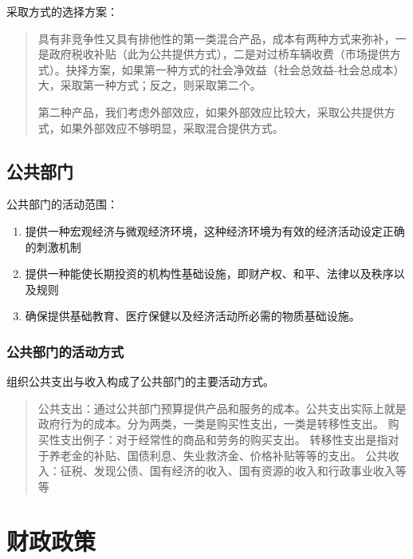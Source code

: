 \documentclass[
]{book}
\providecommand{\tightlist}{%
  \setlength{\itemsep}{0pt}\setlength{\parskip}{0pt}}
\begin{document}
采取方式的选择方案：

\begin{quote}
具有非竞争性又具有排他性的第一类混合产品，成本有两种方式来弥补，一是政府税收补贴（此为公共提供方式），二是对过桥车辆收费（市场提供方式）。抉择方案，如果第一种方式的社会净效益（社会总效益-社会总成本）大，采取第一种方式；反之，则采取第二个。

第二种产品，我们考虑外部效应，如果外部效应比较大，采取公共提供方式，如果外部效应不够明显，采取混合提供方式。
\end{quote}

\hypertarget{ux516cux5171ux90e8ux95e8}{%
\subsection{公共部门}\label{ux516cux5171ux90e8ux95e8}}

公共部门的活动范围：

\begin{enumerate}
\def\labelenumi{\arabic{enumi}.}
\tightlist
\item
  提供一种宏观经济与微观经济环境，这种经济环境为有效的经济活动设定正确的刺激机制
\item
  提供一种能使长期投资的机构性基础设施，即财产权、和平、法律以及秩序以及规则
\item
  确保提供基础教育、医疗保健以及经济活动所必需的物质基础设施。
\end{enumerate}

\hypertarget{ux516cux5171ux90e8ux95e8ux7684ux6d3bux52a8ux65b9ux5f0f}{%
\subsubsection{公共部门的活动方式}\label{ux516cux5171ux90e8ux95e8ux7684ux6d3bux52a8ux65b9ux5f0f}}

组织公共支出与收入构成了公共部门的主要活动方式。

\begin{quote}
公共支出：通过公共部门预算提供产品和服务的成本。公共支出实际上就是政府行为的成本。分为两类，一类是购买性支出，一类是转移性支出。
购买性支出例子：对于经常性的商品和劳务的购买支出。
转移性支出是指对于养老金的补贴、国债利息、失业救济金、价格补贴等等的支出。
公共收入：征税、发现公债、国有经济的收入、国有资源的收入和行政事业收入等等
\end{quote}

\hypertarget{ux8d22ux653fux653fux7b56}{%
\section{财政政策}\label{ux8d22ux653fux653fux7b56}}
\end{document}
